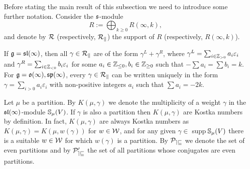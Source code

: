 \documentclass[12pt]{amsart}
\def\mathbb{\Bbb}
\def\mathfrak{\frak}
\def\mathcal{\cal}
\theoremstyle{plain} %
\numberwithin{equation}{section}
\theoremstyle{definition}
\theoremstyle{remark}
\theoremstyle{plain} %
\newcommand{\fg}{\mathfrak{g}}
\newcommand{\fs}{\mathfrak{s}}
\begin{document}
Before stating the main result of this subsection we need to introduce some further notation. Consider the $\fs$-module
$$R:=\bigoplus_{k\geq 0}R(\infty,k),$$
and denote by $\mathcal R$ (respectively, $\mathcal R_k$) the support of $R$  (respectively, $R(\infty,k)$).

If $\fg=\mathfrak{sl}(\infty)$, then all $\gamma\in\mathcal R_k$ are of the form $\gamma^L+\gamma^R$,
 where $\gamma^L=\sum_{i\in \mathbb Z_{>0}}a_i\varepsilon_i$  and
 $\gamma^R=\sum_{i\in \mathbb Z_{<0}}b_i\varepsilon_i$ for some $a_i\in\mathbb Z_{\leq 0}, b_i\in\mathbb Z_{\geq 0}$ such that $-\sum a_i=\sum b_i=k$.
For $\fg=\mathfrak{o}(\infty),\mathfrak{sp}(\infty)$,  every $\gamma\in\mathcal R_k$ can be written uniquely in the form
 $\gamma=\sum_{i>0} a_i\varepsilon_i$ with non-positive integers $a_i$ such that $\sum a_i=-2k$.

 

  Let $\mu$ be a partition. By $K(\mu,\gamma)$ we denote the multiplicity of a weight $\gamma$ in the
$\mathfrak{sl}(\infty)$-module $\mathbb{S}_{\mu}(V)$. If $\gamma$ is also a partition then $K(\mu,\gamma)$ are Kostka numbers by definition. In fact, $K(\mu,\gamma)$ are always Kostka numbers as  $K(\mu,\gamma)= K(\mu, w(\gamma))$ for $w\in \mathcal{W}$, and for any given $\gamma\in$ supp$\:\mathbb{S}_{\mu}(V)$ there is a suitable $w\in \mathcal{W}$ for which $w(\gamma)$ is a partition. By $\mathcal P_{ev}$ we denote the set of even partitions and by $\mathcal P'_{ev}$ the set of all partitions
whose conjugates are even partitions. 
 
\end{document}
